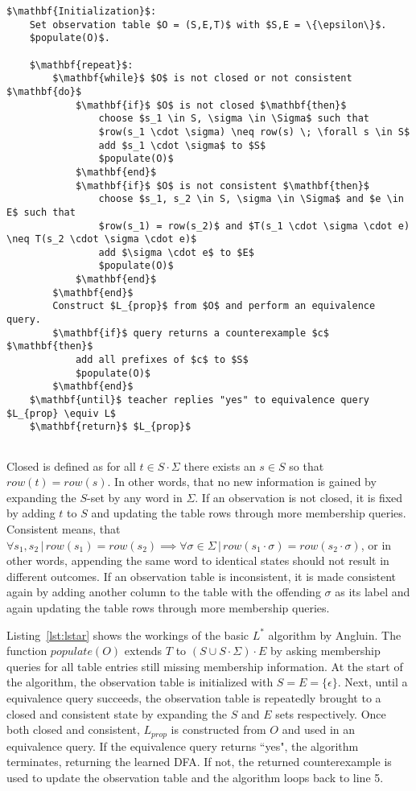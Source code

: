 \begin{lstlisting}[mathescape=true, float=ht, caption=$L^*$ algorithm, label=lst:lstar]
	$\mathbf{Initialization}$: 
	Set observation table $O = (S,E,T)$ with $S,E = \{\epsilon\}$.
	$populate(O)$.
	
	$\mathbf{repeat}$:
		$\mathbf{while}$ $O$ is not closed or not consistent $\mathbf{do}$
			$\mathbf{if}$ $O$ is not closed $\mathbf{then}$
				choose $s_1 \in S, \sigma \in \Sigma$ such that
				$row(s_1 \cdot \sigma) \neq row(s) \; \forall s \in S$
				add $s_1 \cdot \sigma$ to $S$
				$populate(O)$
			$\mathbf{end}$
			$\mathbf{if}$ $O$ is not consistent $\mathbf{then}$
				choose $s_1, s_2 \in S, \sigma \in \Sigma$ and $e \in E$ such that
				$row(s_1) = row(s_2)$ and $T(s_1 \cdot \sigma \cdot e) \neq T(s_2 \cdot \sigma \cdot e)$
				add $\sigma \cdot e$ to $E$
				$populate(O)$
			$\mathbf{end}$		
		$\mathbf{end}$
		Construct $L_{prop}$ from $O$ and perform an equivalence query.	
		$\mathbf{if}$ query returns a counterexample $c$ $\mathbf{then}$
			add all prefixes of $c$ to $S$
			$populate(O)$
		$\mathbf{end}$
	$\mathbf{until}$ teacher replies "yes" to equivalence query $L_{prop} \equiv L$
	$\mathbf{return}$ $L_{prop}$
		
\end{lstlisting}

Closed is defined as for all $t \in S \cdot \Sigma$ there exists an $s \in S$ so that $row(t) = row(s)$. In other words, that no new information is gained by expanding the $S$-set by any word in $\Sigma$. If an observation is not closed, it is fixed by adding $t$ to $S$ and updating the table rows through more membership queries. 
Consistent means, that $\forall s_1, s_2 \,|\, row(s_1) = row(s_2) \implies \forall \sigma \in \Sigma \,|\, row(s_1 \cdot \sigma) = row(s_2 \cdot \sigma)$, or in other words, appending the same word to identical states should not result in different outcomes. If an observation table is inconsistent, it is made consistent again by adding another column to the table with the offending $\sigma$ as its label and again updating the table rows through more membership queries. 

Listing~\ref{lst:lstar} shows the workings of the basic $L^*$ algorithm by Angluin. The function $populate(O)$ extends $T$ to $(S \cup S \cdot \Sigma) \cdot E$ by asking membership queries for all table entries still missing membership information. At the start of the algorithm, the observation table is initialized with $S = E = \{\epsilon\}$. Next, until a equivalence query succeeds, the observation table is repeatedly brought to a closed and consistent state by expanding the $S$ and $E$ sets respectively. Once both closed and consistent, $L_{prop}$ is constructed from $O$ and used in an equivalence query. If the equivalence query returns ``yes", the algorithm terminates, returning the learned DFA. If not, the returned counterexample is used to update the observation table and the algorithm loops back to line 5. 


